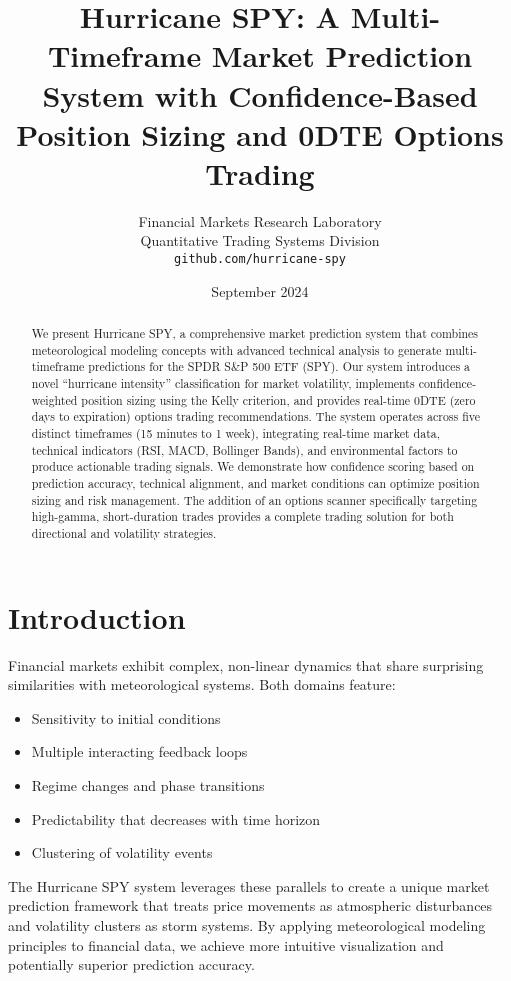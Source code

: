\documentclass[12pt,a4paper]{article}
\title{Hurricane SPY: A Multi-Timeframe Market Prediction System with Confidence-Based Position Sizing and 0DTE Options Trading}
\author{
    Financial Markets Research Laboratory\\
    Quantitative Trading Systems Division\\
    \texttt{github.com/hurricane-spy}
}
\date{September 2024}
\begin{document}
\maketitle

\begin{abstract}
We present Hurricane SPY, a comprehensive market prediction system that combines meteorological modeling concepts with advanced technical analysis to generate multi-timeframe predictions for the SPDR S\&P 500 ETF (SPY). Our system introduces a novel ``hurricane intensity'' classification for market volatility, implements confidence-weighted position sizing using the Kelly criterion, and provides real-time 0DTE (zero days to expiration) options trading recommendations. The system operates across five distinct timeframes (15 minutes to 1 week), integrating real-time market data, technical indicators (RSI, MACD, Bollinger Bands), and environmental factors to produce actionable trading signals. We demonstrate how confidence scoring based on prediction accuracy, technical alignment, and market conditions can optimize position sizing and risk management. The addition of an options scanner specifically targeting high-gamma, short-duration trades provides a complete trading solution for both directional and volatility strategies.
\end{abstract}

\section{Introduction}

Financial markets exhibit complex, non-linear dynamics that share surprising similarities with meteorological systems. Both domains feature:
\begin{itemize}
    \item Sensitivity to initial conditions
    \item Multiple interacting feedback loops
    \item Regime changes and phase transitions
    \item Predictability that decreases with time horizon
    \item Clustering of volatility events
\end{itemize}

The Hurricane SPY system leverages these parallels to create a unique market prediction framework that treats price movements as atmospheric disturbances and volatility clusters as storm systems. By applying meteorological modeling principles to financial data, we achieve more intuitive visualization and potentially superior prediction accuracy.
\end{document}
